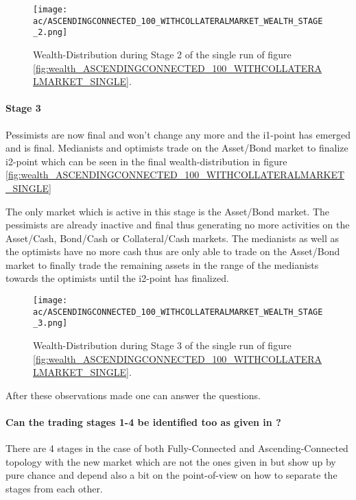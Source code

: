 \documentclass[Bachelorarbeit.tex]{subfiles}
\begin{document}
\begin{figure}[H]
	\centering
  \texttt{[image: ac/ASCENDINGCONNECTED\_100\_WITHCOLLATERALMARKET\_WEALTH\_STAGE\_2.png]}
  	\caption{Wealth-Distribution during Stage 2 of the single run of figure \ref{fig:wealth_ASCENDINGCONNECTED_100_WITHCOLLATERALMARKET_SINGLE}.}
	\label{fig:wealth_ASCENDINGCONNECTED_100_WITHCOLLATERALMARKET_WEALTH_STAGE_2}
\end{figure}

\paragraph{Stage 3}
Pessimists are now final and won't change any more and the i1-point has emerged and is final. Medianists and optimists trade on the Asset/Bond market to finalize i2-point which can be seen in the final wealth-distribution in figure \ref{fig:wealth_ASCENDINGCONNECTED_100_WITHCOLLATERALMARKET_SINGLE}

\medskip
The only market which is active in this stage is the Asset/Bond market. The pessimists are already inactive and final thus generating no more activities on the Asset/Cash, Bond/Cash or Collateral/Cash markets. The medianists as well as the optimists have no more cash thus are only able to trade on the Asset/Bond market to finally trade the remaining assets in the range of the medianists towards the optimists until the i2-point has finalized.

\begin{figure}[H]
	\centering
  \texttt{[image: ac/ASCENDINGCONNECTED\_100\_WITHCOLLATERALMARKET\_WEALTH\_STAGE\_3.png]}
  	\caption{Wealth-Distribution during Stage 3 of the single run of figure \ref{fig:wealth_ASCENDINGCONNECTED_100_WITHCOLLATERALMARKET_SINGLE}.}
	\label{fig:wealth_ASCENDINGCONNECTED_100_WITHCOLLATERALMARKET_WEALTH_STAGE_3}
\end{figure}

After these observations made one can answer the questions.

\paragraph{Can the trading stages 1-4 be identified too as given in \cite{Breuer2015}?}
There are 4 stages in the case of both Fully-Connected and Ascending-Connected topology with the new market which are not the ones given in \cite{Breuer2015} but show up by pure chance and depend also a bit on the point-of-view on how to separate the stages from each other. 
\end{document}
